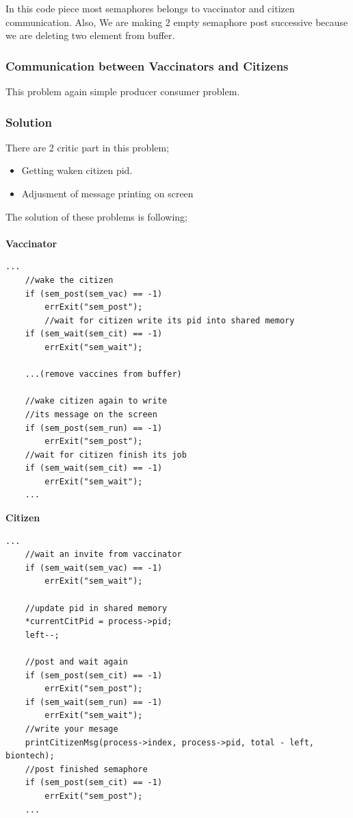 \documentclass{article}
\begin{document}
In this code piece most semaphores belongs to vaccinator and citizen communication.
Also, We are making 2 empty semaphore post successive because we are deleting two element from buffer.
\subsubsection{Communication between Vaccinators and Citizens}
This problem again simple producer consumer problem.
\subsubsection{Solution}
There are 2 critic part in this problem;
\begin{itemize}
	\item Getting waken citizen pid.
	\item Adjusment of message printing on screen
\end{itemize}
The solution of these problems is following;\\ \\
\textbf{Vaccinator}
\begin{lstlisting}[style=CStyle]
    ...
    //wake the citizen
    if (sem_post(sem_vac) == -1)
        errExit("sem_post");
        //wait for citizen write its pid into shared memory
    if (sem_wait(sem_cit) == -1) 
        errExit("sem_wait");

    ...(remove vaccines from buffer)

    //wake citizen again to write
    //its message on the screen
    if (sem_post(sem_run) == -1)
        errExit("sem_post");
    //wait for citizen finish its job
    if (sem_wait(sem_cit) == -1) 
        errExit("sem_wait");
    ...
\end{lstlisting}
\cleardoublepage
\textbf{Citizen}
\begin{lstlisting}[style=CStyle]
    ...
    //wait an invite from vaccinator
    if (sem_wait(sem_vac) == -1)
        errExit("sem_wait");

    //update pid in shared memory    
    *currentCitPid = process->pid;
    left--;

    //post and wait again
    if (sem_post(sem_cit) == -1)
        errExit("sem_post");
    if (sem_wait(sem_run) == -1)
        errExit("sem_wait");
    //write your mesage
    printCitizenMsg(process->index, process->pid, total - left, biontech);
    //post finished semaphore
    if (sem_post(sem_cit) == -1)
        errExit("sem_post");
    ...
\end{lstlisting}
\end{document}
